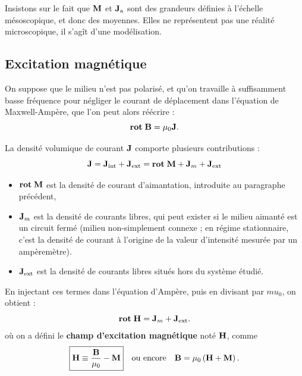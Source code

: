 \documentclass[11pt,a4paper]{report}
\begin{document}
Insistons sur le fait que $\bold{M}$ et $\bold{J}_\text{a}$ sont des grandeurs définies à l'échelle mésoscopique, et donc des moyennes. Elles ne représentent pas une réalité microscopique, il s'agît d'une modélisation.

\subsection{Excitation magnétique}

On suppose que le milieu n'est pas polarisé, et qu'on travaille à suffisamment basse fréquence pour négliger le courant de déplacement dans l'équation de Maxwell-Ampère, que l'on peut alors réécrire :
\begin{equation}
	\textbf{rot}\;\bold{B} = \mu_0 \bold{J}.
\end{equation}

La densité volumique de courant $\bold{J}$ comporte plusieurs contributions :
\begin{equation}
	\bold{J} = \bold{J}_\text{int} + \bold{J_\text{ext}} 
	= \textbf{rot}\;\bold{M} + \bold{J}_m + \bold{J_\text{ext}}
\end{equation}
\begin{itemize}
	\item $\textbf{rot}\;\bold{M}$ est la densité de courant d'aimantation, introduite au paragraphe précédent,
	\item $\bold{J}_m$ est la densité de courants libres, qui peut exister si le milieu aimanté est un circuit fermé (milieu non-simplement connexe ; en régime stationnaire, c'est la densité de courant à l'origine de la valeur d'intensité mesurée par un ampèremètre).
	\item $\bold{J_\text{ext}}$ est la densité de courants libres situés hors du système étudié.\\
\end{itemize}

En injectant ces termes dans l'équation d'Ampère, puis en divisant par $mu_0$, on obtient :
\begin{equation}
	\textbf{rot}\;\bold{H} = \bold{J}_m + \bold{J_\text{ext}}.
\end{equation}
où on a défini le \textbf{champ d'excitation magnétique} noté $\bold{H}$, comme
\begin{equation}
	\boxed{\bold{H} \equiv \frac{\bold{B}}{\mu_0} - \bold{M}} \quad\text{ou encore}\quad 
	\bold{B} = \mu_0\left(\bold{H} + \bold{M}\right).
\end{equation}
\end{document}
